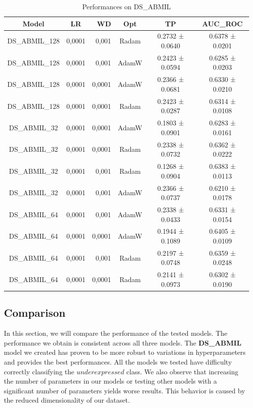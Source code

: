 \documentclass{article}
\begin{document}
\begin{table}[h]
\begin{tabular}{|c|crc|c|c|}
		\hline
		Model & LR & WD & Opt & TP & AUC\_ROC \\
		\hline
		DS\_ABMIL\_128 & 0,0001 & 0,001 & Radam & 0.2732 ± 0.0640 & 0.6378 ± 0.0201 \\
		DS\_ABMIL\_128 & 0,0001 & 0,001 & AdamW & 0.2423 ± 0.0594 & 0.6285 ± 0.0203 \\
		DS\_ABMIL\_128 & 0,0001 & 0,0001 & AdamW & 0.2366 ± 0.0681 & 0.6330 ± 0.0210 \\
		DS\_ABMIL\_128 & 0,0001 & 0,0001 & Radam & 0.2423 ± 0.0287 & 0.6314 ± 0.0108 \\
		DS\_ABMIL\_32 & 0,0001 & 0,0001 & AdamW & 0.1803 ± 0.0901 & 0.6283 ± 0.0161 \\
		DS\_ABMIL\_32 & 0,0001 & 0,0001 & Radam & 0.2338 ± 0.0732 & 0.6362 ± 0.0222 \\
		DS\_ABMIL\_32 & 0,0001 & 0,001 & Radam & 0.1268 ± 0.0904 & 0.6383 ± 0.0113 \\
		DS\_ABMIL\_32 & 0,0001 & 0,001 & AdamW & 0.2366 ± 0.0737 & 0.6210 ± 0.0178 \\
		DS\_ABMIL\_64 & 0,0001 & 0,001 & AdamW & 0.2338 ± 0.0433 & 0.6331 ± 0.0154 \\
		DS\_ABMIL\_64 & 0,0001 & 0,0001 & AdamW & 0.1944 ± 0.1089 & 0.6405 ± 0.0109\\
		DS\_ABMIL\_64 & 0,0001 & 0,001 & Radam & 0.2197 ± 0.0748 & 0.6359 ± 0.0248\\
		DS\_ABMIL\_64 & 0,0001 & 0,0001 & Radam	& 0.2141 ± 0.0973 & 0.6302 ± 0.0190\\
		\hline
	\end{tabular}

	\caption{Performances on DS\_ABMIL}
\end{table}
\clearpage


\subsection{Comparison}

In this section, we will compare the performance of the tested models. The performance we obtain is consistent across all three models. The \textbf{DS\_ABMIL} model we created has proven to be more robust to variations in hyperparameters and provides the best performances. All the models we tested have difficulty correctly classifying the $underexpressed$ class. We also observe that increasing the number of parameters in our models or testing other models with a significant number of parameters yields worse results. This behavior is caused by the reduced dimensionality of our dataset.
\end{document}
